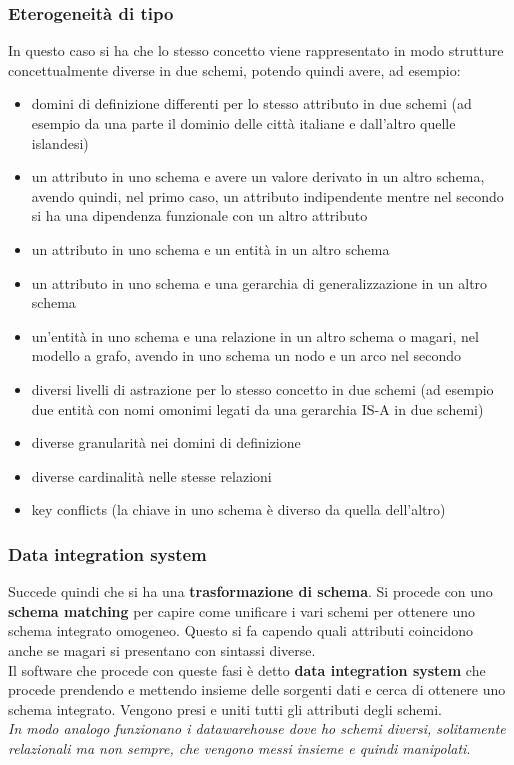 \subsubsection{Eterogeneità di tipo}
In questo caso si ha che lo stesso concetto viene rappresentato in modo strutture concettualmente diverse in due schemi, potendo quindi avere, ad esempio:
\begin{itemize}
    \item domini di definizione differenti per lo stesso attributo in due schemi (ad esempio da una parte il dominio delle città italiane e dall'altro quelle  islandesi)
    \item un attributo in uno schema e avere un valore derivato in un altro schema, avendo quindi, nel primo caso, un attributo indipendente mentre nel secondo si ha una dipendenza funzionale con un altro attributo
    \item un attributo in uno schema e un entità in un altro schema 
    \item un attributo in uno schema e una gerarchia di generalizzazione in un altro schema 
    \item un'entità in uno schema e una relazione in un altro schema o magari, nel modello a grafo, avendo in uno schema un nodo e un arco nel secondo
    \item diversi livelli di astrazione per lo stesso concetto in due schemi (ad esempio due entità con nomi omonimi legati da una gerarchia IS-A in due schemi)  
    \item diverse granularità nei domini di definizione 
    \item diverse cardinalità nelle stesse relazioni 
    \item key conflicts (la chiave in uno schema è diverso da quella dell'altro)
\end{itemize}

\subsubsection{Data integration system}
Succede quindi che si ha una \textbf{trasformazione di schema}. Si procede con uno \textbf{schema matching} per capire come unificare i vari schemi per ottenere uno schema integrato omogeneo. Questo si fa capendo quali attributi coincidono anche se magari si presentano con sintassi diverse. \\
Il software che procede con queste fasi è detto \textbf{data integration system} che procede prendendo e mettendo insieme delle sorgenti dati e cerca di ottenere uno schema integrato. Vengono presi e uniti tutti gli attributi degli schemi.\\ \textit{In modo analogo funzionano i datawarehouse dove ho schemi diversi, solitamente relazionali ma non sempre, che vengono messi insieme e quindi manipolati}.\\

